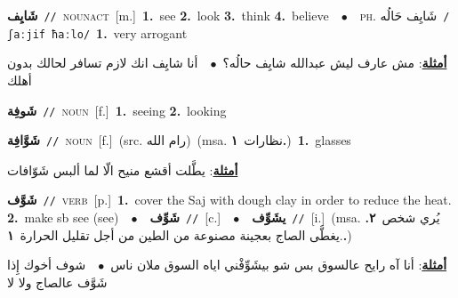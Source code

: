 \documentclass[10pt,a4paper,twoside]{article} %
\begin{document}
\begin{multicols}{2}
{\setlength\topsep{0pt}\textbf{\foreignlanguage{arabic}{شَايِف}}\ {\color{gray}\texttt{//}\color{black}}\ \textsc{noun\textunderscore act}\ [m.]\ \textbf{1.}~see  \textbf{2.}~look  \textbf{3.}~think  \textbf{4.}~believe\ \ $\bullet$\ \ \textsc{ph.} \color{gray} \foreignlanguage{arabic}{شَايِف حَالُه}\color{black}\ {\color{gray}\texttt{/{\sffamily ʃaːjif ħaːlo}/}\color{black}}\ \textbf{1.}~very arrogant\  \begin{flushright}\color{gray}\foreignlanguage{arabic}{\textbf{\underline{\foreignlanguage{arabic}{أمثلة}}}: مش عارف ليش عبدالله شايِف حالُه؟\ $\bullet$\ \  أنا شايِف انك لازم تسافر لحالك بدون أهلك}\end{flushright}\color{black}} \vspace{2mm}

{\setlength\topsep{0pt}\textbf{\foreignlanguage{arabic}{شَوفِة}}\ {\color{gray}\texttt{//}\color{black}}\ \textsc{noun}\ [f.]\ \textbf{1.}~seeing  \textbf{2.}~looking\ } \vspace{2mm}

{\setlength\topsep{0pt}\textbf{\foreignlanguage{arabic}{شَوَّافِة}}\ {\color{gray}\texttt{//}\color{black}}\ \textsc{noun}\ [f.]\ (src. \color{gray}\foreignlanguage{arabic}{رام الله}\color{black})\ \color{gray}(msa. \foreignlanguage{arabic}{نظارات}~\foreignlanguage{arabic}{\textbf{١.}})\color{black}\ \textbf{1.}~glasses\  \begin{flushright}\color{gray}\foreignlanguage{arabic}{\textbf{\underline{\foreignlanguage{arabic}{أمثلة}}}: يطَّلت أقشع منيح الّا لما ألبس شَوّافات}\end{flushright}\color{black}} \vspace{2mm}

{\setlength\topsep{0pt}\textbf{\foreignlanguage{arabic}{شَوَّف}}\ {\color{gray}\texttt{//}\color{black}}\ \textsc{verb}\ [p.]\ \textbf{1.}~cover the Saj with dough clay in order to reduce the heat.  \textbf{2.}~make sb see (see)\ \ $\bullet$\ \ \setlength\topsep{0pt}\textbf{\foreignlanguage{arabic}{شَوِّف}}\ {\color{gray}\texttt{//}\color{black}}\ [c.]\ \ $\bullet$\ \ \setlength\topsep{0pt}\textbf{\foreignlanguage{arabic}{يشَوِّف}}\ {\color{gray}\texttt{//}\color{black}}\ [i.]\ \color{gray}(msa. \foreignlanguage{arabic}{يُري شخص}~\foreignlanguage{arabic}{\textbf{٢.}}  .\foreignlanguage{arabic}{يغطَّى الصاج بعجينة مصنوعة من الطين من أجل تقليل الحرارة}~\foreignlanguage{arabic}{\textbf{١.}})\color{black}\  \begin{flushright}\color{gray}\foreignlanguage{arabic}{\textbf{\underline{\foreignlanguage{arabic}{أمثلة}}}: أنا آه رايح عالسوق بس شو بيشَوِّفْني اياه السوق ملان ناس\ $\bullet$\ \  شوف أخوك إِذا شَوَّف عالصاج ولا لا}\end{flushright}\color{black}} \vspace{2mm}


\end{multicols}
\end{document}
